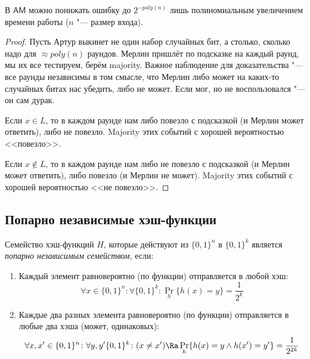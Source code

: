 	\begin{assertion}
		В $\mathsf{AM}$ можно понижать ошибку до $2^{-poly(n)}$ лишь полиномиальным увеличением времени работы ($n$ "--- размер входа).
	\end{assertion}
	\begin{proof}
		Пусть Артур выкинет не один набор случайных бит, а столько, сколько надо для $\approx poly(n)$ раундов.
		Мерлин пришлёт по подсказке на каждый раунд, мы их все тестируем, берём majority.
		Важное наблюдение для доказательства "--- все раунды независимы в том смысле, что Мерлин либо может на каких-то случайных битах
		нас убедить, либо не может.
		Если мог, но не воспользовался "--- он сам дурак.

		Если $x \in L$, то в каждом раунде нам либо повезло с подсказкой (и Мерлин может ответить), либо не повезло.
		Majority этих событий с хорошей вероятностью <<повезло>>.

		Если $x \notin L$, то в каждом раунде нам либо не повезло с подсказкой (и Мерлин может ответить), либо повезло (и Мерлин не может).
		Majority этих событий с хорошей вероятностью <<не повезло>>.
	\end{proof}

\subsection{Попарно независимые хэш-функции}
	\begin{Def}
		Семейство хэш-функций $H$, которые действуют из $\{0, 1\}^n$ в $\{0, 1\}^k$ является \textit{попарно независимым семейством}, если:
		\begin{enumerate}
			\item Каждый элемент равновероятно (по функции) отправляется в любой хэш:
				\[ \forall x \in \{0, 1\}^n \colon \forall \{0, 1\}^k \colon \Pr_h \{ h(x) = y \} = \frac{1}{2^k} \]
			\item Каждые два разных элемента равновероятно (по функции) отправляется в любые два хэша (может, одинаковых):
				\[ \forall x, x' \in \{0, 1\}^n \colon \forall y, y' \{0, 1\}^k \colon (x \neq x') \Ra \Pr_h \{ h(x) = y \land h(x') = y' \} = \frac{1}{2^{2k}} \]
		\end{enumerate}
	\end{Def}

